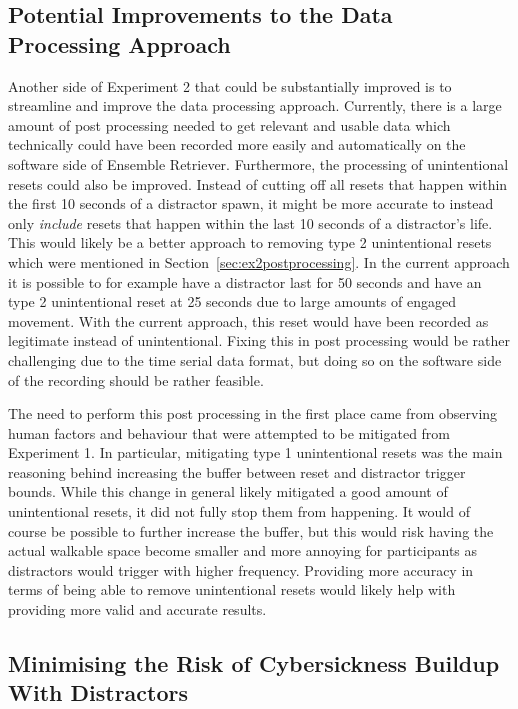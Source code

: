 \subsection{Potential Improvements to the Data Processing Approach}
Another side of Experiment 2 that could be substantially improved is to streamline and improve the data processing approach. Currently, there is a large amount of post processing needed to get relevant and usable data which technically could have been recorded more easily and automatically on the software side of Ensemble Retriever. Furthermore, the processing of unintentional resets could also be improved. Instead of cutting off all resets that happen within the first 10 seconds of a distractor spawn, it might be more accurate to instead only \emph{include} resets that happen within the last 10 seconds of a distractor's life. This would likely be a better approach to removing type 2 unintentional resets which were mentioned in Section~\ref{sec:ex2postprocessing}. In the current approach it is possible to for example have a distractor last for 50 seconds and have an type 2 unintentional reset at 25 seconds due to large amounts of engaged movement. With the current approach, this reset would have been recorded as legitimate instead of unintentional. Fixing this in post processing would be rather challenging due to the time serial data format, but doing so on the software side of the recording should be rather feasible. 

The need to perform this post processing in the first place came from observing human factors and behaviour that were attempted to be mitigated from Experiment 1. In particular, mitigating type 1 unintentional resets was the main reasoning behind increasing the buffer between reset and distractor trigger bounds. While this change in general likely mitigated a good amount of unintentional resets, it did not fully stop them from happening. It would of course be possible to further increase the buffer, but this would risk having the actual walkable space become smaller and more annoying for participants as distractors would trigger with higher frequency. Providing more accuracy in terms of being able to remove unintentional resets would likely help with providing more valid and accurate results. 

\subsection{Minimising the Risk of Cybersickness Buildup With Distractors}\label{sec:ex2MinimisingCybersickness}

